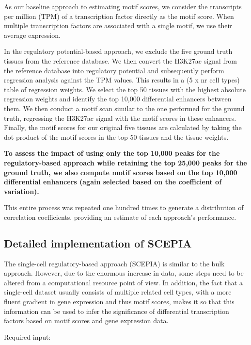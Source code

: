 As our baseline approach to estimating motif scores, we consider the transcripts per million (TPM) of a transcription factor directly as the motif score. When multiple transcription factors are associated with a single motif, we use their average expression.

In the regulatory potential-based approach, we exclude the five ground truth tissues from the reference database. We then convert the H3K27ac signal from the reference database into regulatory potential and subsequently perform regression analysis against the TPM values. This results in a (5 x nr cell types) table of regression weights. We select the top 50 tissues with the highest absolute regression weights and identify the top 10,000 differential enhancers between them. We then conduct a motif scan similar to the one performed for the ground truth, regressing the H3K27ac signal with the motif scores in these enhancers. Finally, the motif scores for our original five tissues are calculated by taking the dot product of the motif scores in the top 50 tissues and the tissue weights.

\textbf{To assess the impact of using only the top 10,000 peaks for the regulatory-based approach while retaining the top 25,000 peaks for the ground truth, we also compute motif scores based on the top 10,000 differential enhancers (again selected based on the coefficient of variation).}

This entire process was repeated one hundred times to generate a distribution of correlation coefficients, providing an estimate of each approach's performance.

\subsection{Detailed implementation of SCEPIA}

The single-cell regulatory-based approach (SCEPIA) is similar to the bulk approach. However, due to the enormous increase in data, some steps need to be altered from a computational resource point of view. In addition, the fact that a single-cell dataset usually consists of multiple related cell types, with a more fluent gradient in gene expression and thus motif scores, makes it so that this information can be used to infer the significance of differential transcription factors based on motif scores and gene expression data.

\noindent
Required input:

